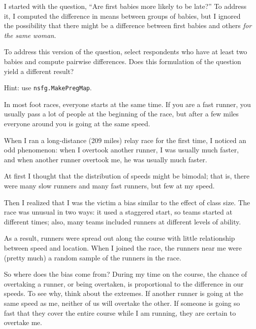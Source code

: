 \documentclass[12pt]{book}
\begin{document}
\begin{exercise}
I started with the question, ``Are first babies more likely
to be late?''  To address it, I computed the difference in
means between groups of babies, but I ignored the possibility
that there might be a difference between first babies and
others {\em for the same woman}.

To address this version of the question, select respondents who
have at least two babies and compute pairwise differences.  Does
this formulation of the question yield a different result?

Hint: use {\tt nsfg.MakePregMap}.
\end{exercise}


\begin{exercise}
\label{relay}

In most foot races, everyone starts at the same time.  If you are a
fast runner, you usually pass a lot of people at the beginning of the
race, but after a few miles everyone around you is going at the same
speed.

When I ran a long-distance (209 miles) relay race for the first
time, I noticed an odd phenomenon: when I overtook another runner, I
was usually much faster, and when another runner overtook me, he was
usually much faster.

At first I thought that the distribution of speeds might be bimodal;
that is, there were many slow runners and many fast runners, but few
at my speed.

Then I realized that I was the victim a bias similar to the
effect of class size.  The race
was unusual in two ways: it used a staggered start, so teams started
at different times; also, many teams included runners at different
levels of ability.  

As a result, runners were spread out along the course with little
relationship between speed and location.  When I joined the race, the
runners near me were (pretty much) a random sample of the runners in
the race.

So where does the bias come from?  During my time on the course, the
chance of overtaking a runner, or being overtaken, is proportional to
the difference in our speeds.  To see why, think about the extremes.
If another runner is going at the same speed as me, neither of us will
overtake the other.  If someone is going so fast that they cover the
entire course while I am running, they are certain to overtake me.


\end{exercise}
\end{document}
